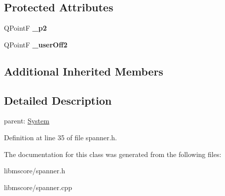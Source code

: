 \subsection*{Protected Attributes}
\begin{DoxyCompactItemize}
\item 
\mbox{\label{class_ms_1_1_spanner_segment_aca5ef131ff81c054e00c2da4f76f4cf3}} 
Q\+PointF {\bfseries \+\_\+p2}
\item 
\mbox{\label{class_ms_1_1_spanner_segment_a0abb5fe95a7d6f0c765443c5b71d64c9}} 
Q\+PointF {\bfseries \+\_\+user\+Off2}
\end{DoxyCompactItemize}
\subsection*{Additional Inherited Members}


\subsection{Detailed Description}
parent\+: \hyperlink{class_ms_1_1_system}{System} 

Definition at line 35 of file spanner.\+h.



The documentation for this class was generated from the following files\+:\begin{DoxyCompactItemize}
\item 
libmscore/spanner.\+h\item 
libmscore/spanner.\+cpp\end{DoxyCompactItemize}

